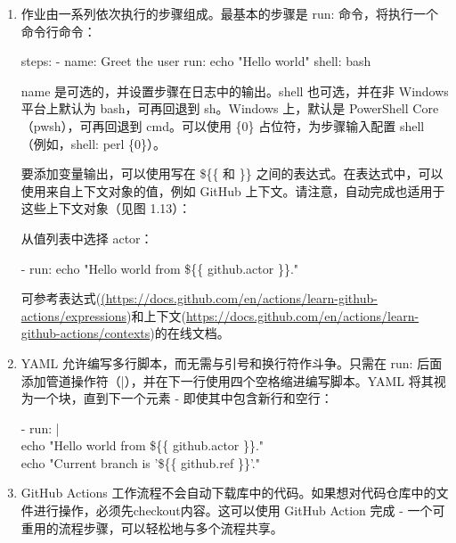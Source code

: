 \begin{enumerate}
\item 
作业由一系列依次执行的步骤组成。最基本的步骤是 run: 命令，将执行一个命令行命令：

\begin{shell}
steps:
  - name: Greet the user
    run: echo "Hello world"
    shell: bash
\end{shell}

name 是可选的，并设置步骤在日志中的输出。shell 也可选，并在非 Windows 平台上默认为 bash，可再回退到 sh。Windows 上，默认是 PowerShell Core（pwsh），可再回退到 cmd。可以使用 \{0\} 占位符，为步骤输入配置 shell（例如，shell: perl \{0\}）。

要添加变量输出，可以使用写在 \$\{\{ 和 \}\} 之间的表达式。在表达式中，可以使用来自上下文对象的值，例如 GitHub 上下文。请注意，自动完成也适用于这些上下文对象（见图 1.13）：


从值列表中选择 actor：

\begin{tcolorbox}[ breakable,colback = bashcodebg, colframe= black!50!white]
\scriptsize{
- run: echo "Hello world  from \$\{\{ github.actor \}\}."
}
\end{tcolorbox}

可参考表达式(\url{(https://docs.github.com/en/actions/learn-github-actions/expressions})和上下文(\url{https://docs.github.com/en/actions/learn-github-actions/contexts})的在线文档。

\item 
YAML 允许编写多行脚本，而无需与引号和换行符作斗争。只需在 run: 后面添加管道操作符（|），并在下一行使用四个空格缩进编写脚本。YAML 将其视为一个块，直到下一个元素 - 即使其中包含新行和空行：

\begin{tcolorbox}[ breakable,colback = bashcodebg, colframe= black!50!white]
\scriptsize{
- run: | \\
\hspace*{2em}echo "Hello world  from \$\{\{ github.actor \}\}." \\
\hspace*{2em}echo "Current branch is '\$\{\{ github.ref \}\}'."
}
\end{tcolorbox}

\item 
GitHub Actions 工作流程不会自动下载库中的代码。如果想对代码仓库中的文件进行操作，必须先checkout内容。这可以使用 GitHub Action 完成 - 一个可重用的流程步骤，可以轻松地与多个流程共享。


\end{enumerate}
